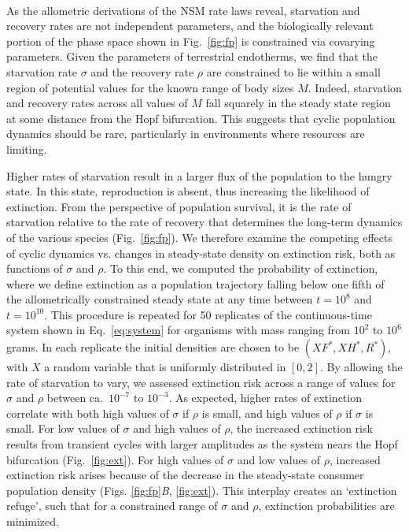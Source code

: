 \documentclass{pnastwo}
\begin{document}
\begin{article}
\\
As the allometric derivations of the NSM rate laws reveal, starvation and recovery rates are not independent parameters, and the biologically relevant portion of the phase space shown in Fig.~\ref{fig:fp} is constrained via covarying parameters.
Given the parameters of terrestrial endotherms, we find that the starvation rate $\sigma$ and the recovery rate $\rho$ are constrained to lie within a small region of potential values for the known range of body sizes $M$.
Indeed, starvation and recovery rates across all values of $M$ fall squarely in the steady state region at some distance from the Hopf bifurcation. 
This suggests that cyclic population dynamics should be rare, particularly in environments where resources are limiting.

Higher rates of starvation result in a larger flux of the population to the hungry state.
In this state, reproduction is absent, thus increasing the likelihood of extinction.  From the perspective of population survival, it is the rate of starvation relative to the rate of recovery that determines the long-term dynamics of the various species (Fig.~\ref{fig:fp}).
We therefore examine the competing effects of cyclic dynamics vs. changes in steady-state density on extinction risk, both as functions of $\sigma$ and $\rho$.
To this end, we computed the probability of extinction, where we define extinction as a population trajectory falling below one fifth of the allometrically constrained steady state at any time between $t=10^8$ and $t=10^{10}$.
This procedure is repeated for 50 replicates of the continuous-time system shown in Eq.~\ref{eq:system} for organisms with mass ranging from $10^2$ to $10^6$ grams.
In each replicate the initial densities are chosen to be $(XF^*,XH^*,R^*)$, with $X$ a random variable that is uniformly distributed in $[0,2]$.
By allowing the rate of starvation to vary, we assessed extinction risk across a range of values for $\sigma$ and $\rho$ between ca.\ $10^{-7}$ to $10^{-3}$. %
As expected, higher rates of extinction correlate with both high values of $\sigma$ if $\rho$ is small, and high values of $\rho$ if $\sigma$ is small.
For low values of $\sigma$ and high values of $\rho$, the increased extinction risk results from transient cycles with larger amplitudes as the system nears the Hopf bifurcation (Fig.~\ref{fig:ext}).
For high values of $\sigma$ and low values of $\rho$, increased extinction risk arises because of the decrease in the steady-state consumer population density (Figs. \ref{fig:fp}\emph{B}, \ref{fig:ext}).
This interplay creates an `extinction refuge', such that for a constrained range of $\sigma$ and $\rho$, extinction probabilities are minimized.


\end{article}
\end{document}
